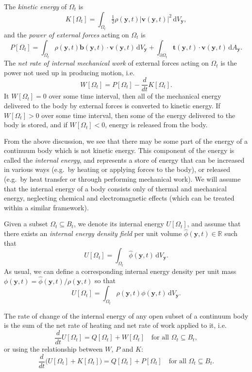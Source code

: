 \documentclass[
  letterpaper,
  DIV=11,
  numbers=noendperiod]{scrreprt}
\theoremstyle{plain}
\theoremstyle{remark}
\begin{document}
The \emph{kinetic energy} of \(\Omega_t\) is
\[K[\Omega_t] = \int_{\Omega_t}\tfrac12\rho({\boldsymbol{y}},t)|{\boldsymbol{v}}({\boldsymbol{y}},t)|^2{\,{\mathrm{d}}V_{{\boldsymbol{y}}}},\]
and the \emph{power of external forces} acting on \(\Omega_t\) is
\[P[\Omega_t] = \int_{\Omega_t}\rho({\boldsymbol{y}},t){\boldsymbol{b}}({\boldsymbol{y}},t)\cdot{\boldsymbol{v}}({\boldsymbol{y}},t){\,{\mathrm{d}}V_{{\boldsymbol{y}}}}+\int_{\partial \Omega_t}{\boldsymbol{t}}({\boldsymbol{y}},t)\cdot{\boldsymbol{v}}({\boldsymbol{y}},t){\,{\mathrm{d}}A_{{\boldsymbol{y}}}}.\]
The \emph{net rate of internal mechanical work} of external forces
acting on \(\Omega_t\) is the power not used up in producing motion,
i.e. \[W[\Omega_t] = P[\Omega_t]-\frac{d}{dt}K[\Omega_t].\] It
\(W[\Omega_t]=0\) over some time interval, then all of the mechanical
energy delivered to the body by external forces is converted to kinetic
energy. If \(W[\Omega_t]>0\) over some time interval, then some of the
energy delivered to the body is stored, and if \(W[\Omega_t]<0\), energy
is released from the body.

From the above discussion, we see that there may be some part of the
energy of a continuum body which is not kinetic energy. This component
of the energy is called the \emph{internal energy}, and represents a
store of energy that can be increased in various ways (e.g.~by heating
or applying forces to the body), or released (e.g.~by heat transfer or
through performing mechanical work). We will assume that the internal
energy of a body consists only of thermal and mechanical energy,
neglecting chemical and electromagnetic effects (which can be treated
within a similar framework).

Given a subset \(\Omega_t\subseteq B_t\), we denote its internal energy
\(U[\Omega_t]\), and assume that there exists an \emph{internal energy
density field} per unit volume
\(\hat{\phi}({\boldsymbol{y}},t)\in{\mathbb{R}}\) such that
\[U[\Omega_t] = \int_{\Omega_t}\hat{\phi}({\boldsymbol{y}},t){\,{\mathrm{d}}V_{{\boldsymbol{y}}}}.\]
As usual, we can define a corresponding internal energy density per unit
mass
\(\phi({\boldsymbol{y}},t) = \hat{\phi}({\boldsymbol{y}},t)/\rho({\boldsymbol{y}},t)\)
so that
\[U[\Omega_t] = \int_{\Omega_t} \rho({\boldsymbol{y}},t)\phi({\boldsymbol{y}},t){\,{\mathrm{d}}V_{{\boldsymbol{y}}}}.\]

\label{ax:1stLaw}{} The rate of change of the internal
energy of any open subset of a continuum body is the sum of the net rate
of heating and net rate of work applied to it, i.e.
\[\frac{d}{dt}U[\Omega_t]=Q[\Omega_t]+W[\Omega_t]\quad\text{for all }\Omega_t\subseteq B_t,\]
or using the relationship between \(W\), \(P\) and \(K\):
\[\frac{d}{dt}\Big(U[\Omega_t]+K[\Omega_t]\Big)=Q[\Omega_t]+P[\Omega_t]\quad\text{for all }\Omega_t\subseteq B_t.\]
\end{document}

